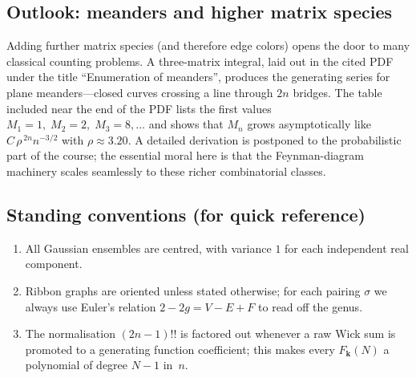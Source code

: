 \documentclass[letterpaper,11pt,oneside,reqno]{article}
\numberwithin{equation}{section}
\theoremstyle{definition}
\begin{document}
\subsection{Outlook: meanders and higher matrix species}
\label{subsec:meanders-brief}

Adding further matrix species (and therefore edge colors)
opens the door to many classical counting problems.
A three-matrix integral, laid out in the cited PDF under the title
“Enumeration of meanders”, produces the generating series for
plane meanders—closed curves crossing a line through $2n$ bridges.
The table included near the end of the PDF lists the first values
\(
  M_1=1,\;M_2=2,\;M_3=8,\dots
\)
and shows that $M_n$ grows asymptotically like
\(
  C\,\rho^{\,2n}n^{-3/2}
\)
with $\rho\approx3.20$.
A detailed derivation is postponed to the probabilistic part of the
course; the essential moral here is that the Feynman-diagram machinery
scales seamlessly to these richer combinatorial classes.

\subsection*{Standing conventions (for quick reference)}
\begin{enumerate}[(1)]
  \item All Gaussian ensembles are centred, with variance $1$ for each
        independent real component.
  \item Ribbon graphs are oriented unless stated otherwise; for each
        pairing $\sigma$ we always use Euler’s relation
        $2-2g=V-E+F$ to read off the genus.
  \item The normalisation $(2n-1)!!$ is factored out whenever a raw Wick
        sum is promoted to a generating function coefficient; this makes
        every $F_{\mathbf k}(N)$ a polynomial of degree $N-1$ in~$n$.
\end{enumerate}
\end{document}

